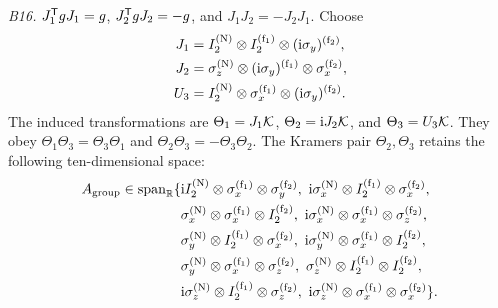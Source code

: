 \medskip\noindent\textit{B16.}\quad
\(J_1^{\mathsf{T}} gJ_1=g\), \(J_2^{\mathsf{T}} gJ_2=-g\), and
\(J_1J_2=-J_2J_1\).
Choose
\begin{equation*}
\begin{aligned}
J_1&=I_2^{({\rm N})}\otimes I_2^{({\rm f}_1)}
       \otimes(\mathrm{i}\sigma_y)^{({\rm f}_2)},\\
J_2&=\sigma_z^{({\rm N})}\otimes(\mathrm{i}\sigma_y)^{({\rm f}_1)}
       \otimes\sigma_x^{({\rm f}_2)},\\
U_3&=I_2^{({\rm N})}\otimes\sigma_x^{({\rm f}_1)}
       \otimes(\mathrm{i}\sigma_y)^{({\rm f}_2)} .
\end{aligned}
\end{equation*}
The induced transformations are \(\Theta_1=J_1\mathcal{K}\),
\(\Theta_2=\mathrm{i} J_2\mathcal{K}\), and \(\Theta_3=U_3\mathcal{K}\).
They obey \(\Theta_1\Theta_3=\Theta_3\Theta_1\) and
\(\Theta_2\Theta_3=-\Theta_3\Theta_2\).  The Kramers pair
\(\Theta_2,\Theta_3\) retains the following ten-dimensional space:
\begin{align*}
A_{\rm group}\in\operatorname{span}_{\mathbb R}\{&
\mathrm{i} I_2^{({\rm N})}\otimes\sigma_x^{({\rm f}_1)}\otimes\sigma_y^{({\rm f}_2)},
\ \mathrm{i}\sigma_x^{({\rm N})}\otimes I_2^{({\rm f}_1)}\otimes\sigma_x^{({\rm f}_2)},\\
&\sigma_x^{({\rm N})}\otimes\sigma_x^{({\rm f}_1)}\otimes I_2^{({\rm f}_2)},
\ \mathrm{i}\sigma_x^{({\rm N})}\otimes\sigma_x^{({\rm f}_1)}\otimes\sigma_z^{({\rm f}_2)},\\
&\sigma_y^{({\rm N})}\otimes I_2^{({\rm f}_1)}\otimes\sigma_x^{({\rm f}_2)},
\ \mathrm{i}\sigma_y^{({\rm N})}\otimes\sigma_x^{({\rm f}_1)}\otimes I_2^{({\rm f}_2)},\\
&\sigma_y^{({\rm N})}\otimes\sigma_x^{({\rm f}_1)}\otimes\sigma_z^{({\rm f}_2)},
\ \sigma_z^{({\rm N})}\otimes I_2^{({\rm f}_1)}\otimes I_2^{({\rm f}_2)},\\
&\mathrm{i}\sigma_z^{({\rm N})}\otimes I_2^{({\rm f}_1)}\otimes\sigma_z^{({\rm f}_2)},
\ \mathrm{i}\sigma_z^{({\rm N})}\otimes\sigma_x^{({\rm f}_1)}\otimes\sigma_x^{({\rm f}_2)}
\}.
\end{align*}

